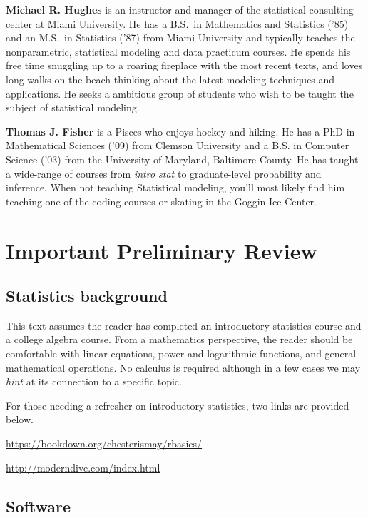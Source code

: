 \documentclass[
]{book}
\begin{document}
\textbf{Michael R. Hughes} is an instructor and manager of the statistical consulting center at Miami University.
He has a B.S.~in Mathematics and Statistics ('85) and an M.S.~in Statistics ('87) from Miami University and typically teaches the nonparametric, statistical modeling and data practicum courses.
He spends his free time snuggling up to a roaring fireplace with the most recent texts, and loves long walks on the beach thinking about the latest modeling techniques and applications.
He seeks a ambitious group of students who wish to be taught the subject of statistical modeling.

\textbf{Thomas J. Fisher} is a Pisces who enjoys hockey and hiking.
He has a PhD in Mathematical Sciences ('09) from Clemson University and a B.S. in Computer Science ('03) from the University of Maryland, Baltimore County.
He has taught a wide-range of courses from \emph{intro stat} to graduate-level probability and inference.
When not teaching Statistical modeling, you'll most likely find him teaching one of the coding courses or skating in the Goggin Ice Center.

\hypertarget{important-preliminary-review}{%
\chapter*{Important Preliminary Review}\label{important-preliminary-review}}

\hypertarget{statistics-background}{%
\section*{Statistics background}\label{statistics-background}}

This text assumes the reader has completed an introductory statistics course and a college algebra course. From a mathematics perspective, the reader should be comfortable with linear equations, power and logarithmic functions, and general mathematical operations. No calculus is required although in a few cases we may \emph{hint} at its connection to a specific topic.

For those needing a refresher on introductory statistics, two links are provided below.

\url{https://bookdown.org/chesterismay/rbasics/}

\url{http://moderndive.com/index.html}

\hypertarget{software}{%
\section*{Software}\label{software}}
\end{document}
